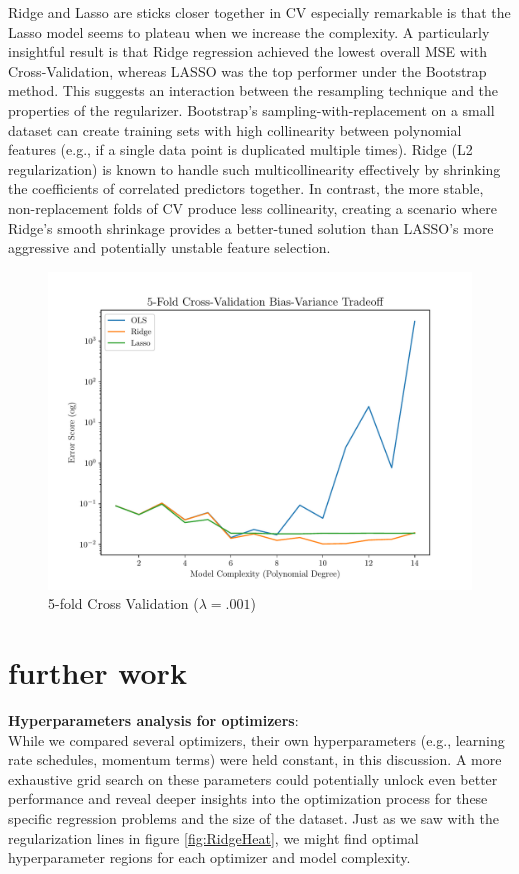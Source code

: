 \documentclass[twocolumn,aps]{revtex4}
\begin{document}
Ridge and Lasso are sticks closer together in CV especially remarkable is that the Lasso model seems to plateau when we increase the complexity.
A particularly insightful result is that Ridge regression achieved the lowest overall MSE with Cross-Validation, whereas LASSO was the top performer under the Bootstrap method. 
This suggests an interaction between the resampling technique and the properties of the regularizer. 
Bootstrap's sampling-with-replacement on a small dataset can create training sets with high collinearity between polynomial features (e.g., if a single data point is duplicated multiple times). 
Ridge (L2 regularization) is known to handle such multicollinearity effectively by shrinking the coefficients of correlated predictors together. 
In contrast, the more stable, non-replacement folds of CV produce less collinearity, creating a scenario where Ridge's smooth shrinkage provides a better-tuned solution than LASSO's more aggressive and potentially unstable feature selection.


\begin{figure}[h]
    \centering
    \includegraphics[width=.95 \linewidth]{Figures/Cross_Validation.pdf}
    \caption{5-fold Cross Validation ($\lambda=.001$)}
    \label{fig:CrossValidation}
\end{figure}

\section{further work}

\textbf{Hyperparameters analysis for optimizers}:
\\
While we compared several optimizers, their own hyperparameters (e.g., learning rate schedules, momentum terms) were held constant, in this discussion.
A more exhaustive grid search on these parameters could potentially unlock even better performance and reveal deeper insights into the optimization process for these specific regression problems and the size of the dataset.
Just as we saw with the regularization lines in figure \ref{fig:RidgeHeat}, we might find optimal hyperparameter regions for each optimizer and model complexity.
\\
\end{document}
